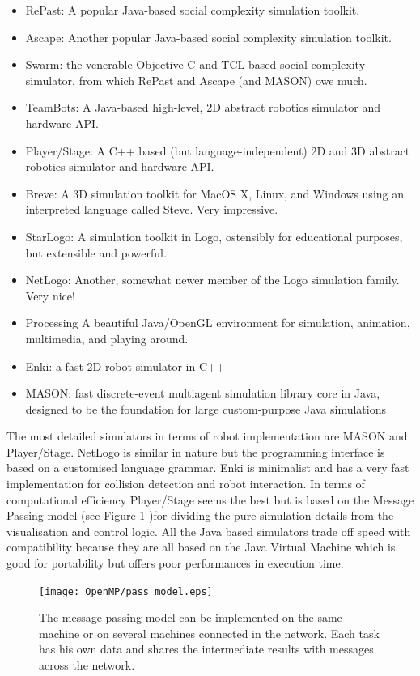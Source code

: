 \begin{itemize}
\item RePast: A popular Java-based social complexity simulation toolkit.
\item Ascape: Another popular Java-based social complexity simulation toolkit.
\item Swarm: the venerable Objective-C and TCL-based social complexity simulator,
      from which RePast and Ascape (and MASON) owe much.
\item TeamBots: A Java-based high-level, 2D abstract robotics simulator and
      hardware API.
\item Player/Stage: A C++ based (but language-independent) 2D and 3D abstract
      robotics simulator and hardware API.
\item Breve: A 3D simulation toolkit for MacOS X, Linux, and Windows using
      an interpreted language called Steve. Very impressive.
\item StarLogo: A simulation toolkit in Logo, ostensibly for educational purposes,
      but extensible and powerful.
\item NetLogo: Another, somewhat newer member of the Logo simulation family. Very nice!
\item Processing A beautiful Java/OpenGL environment for simulation, animation,
      multimedia, and playing around.
\item Enki: a fast 2D robot simulator in C++
\item MASON: fast discrete-event multiagent simulation library core in Java,
      designed to be the foundation for large custom-purpose Java simulations
\end{itemize}
The most detailed simulators in terms of robot implementation are MASON and
Player/Stage.
NetLogo is similar in nature but the programming interface is based on a
customised language grammar.
Enki is minimalist and has a very fast implementation for collision detection
and robot interaction.
In terms of computational efficiency Player/Stage seems the best but is based
on the Message Passing model (see Figure \ref{Fig:Parallel:passModel} )for dividing
the pure simulation details from the visualisation and control logic.
All the Java based simulators trade off speed with compatibility because
they are all based on the Java Virtual Machine which is good for portability
but offers poor performances in execution time.

\begin{figure}[htbp]
\begin{center}
\texttt{[image: OpenMP/pass\_model.eps]}
\end{center}
\small{
\caption[The message passing model]{
The message passing model can be implemented on the same machine or on several
machines connected in the network. Each task has his own data and shares the
intermediate results with messages across the network.
\label{Fig:Parallel:passModel}}}
\end{figure}

